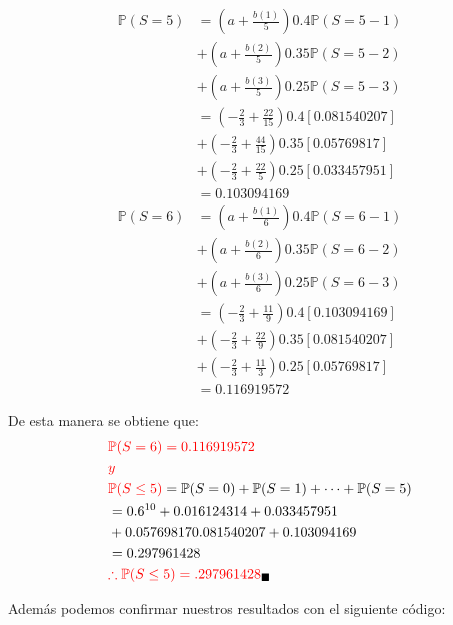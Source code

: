 \documentclass[
]{article}
\begin{document}
\begin{align*}
\mathbb{P}(S = 5) &= \left(a + \frac{b(1)}{5}\right)0.4\mathbb{P}(S = 5 - 1)\\
&+  \left(a + \frac{b(2)}{5}\right)0.35\mathbb{P}(S = 5 - 2)\\
&+ \left(a + \frac{b(3)}{5}\right)0.25\mathbb{P}(S = 5 - 3)\\
&= \left(-\frac{2}{3} + \frac{22}{15}\right)0.4[0.081540207]\\
&+ \left(-\frac{2}{3} + \frac{44}{15}\right)0.35[0.05769817]\\
&+ \left(-\frac{2}{3} + \frac{22}{5}\right)0.25[0.033457951]\\
&= 0.103094169
\end{align*} \begin{align*}
\mathbb{P}(S = 6) &= \left(a + \frac{b(1)}{6}\right)0.4\mathbb{P}(S = 6 - 1)\\
&+ \left(a + \frac{b(2)}{6}\right)0.35\mathbb{P}(S = 6 - 2)\\
&+ \left(a + \frac{b(3)}{6}\right)0.25\mathbb{P}(S = 6 - 3)\\
&= \left(-\frac{2}{3} + \frac{11}{9}\right)0.4[0.103094169]\\
&+ \left(-\frac{2}{3} + \frac{22}{9}\right)0.35[0.081540207]\\
&+ \left(-\frac{2}{3} + \frac{11}{3}\right)0.25[0.05769817]\\
&= 0.116919572
\end{align*}

De esta manera se obtiene que: \begin{align*}
&\textcolor{red}{\mathbb{P}(S = 6) = 0.116919572}\\
&\textcolor{red}{y}\\
&\textcolor{red}{\mathbb{P}(S \leq 5)} = \mathbb{P}(S = 0) + \mathbb{P}(S = 1) + \dots + \mathbb{P}(S = 5)\\
&= 0.6^{10} + 0.016124314 + 0.033457951\\
&+ 0.05769817 0.081540207 + 0.103094169\\
&= 0.297961428\\
&\textcolor{red}{\therefore \mathbb{P}(S \leq 5) = .297961428}_\blacksquare
\end{align*}

Además podemos confirmar nuestros resultados con el siguiente código:
\end{document}
